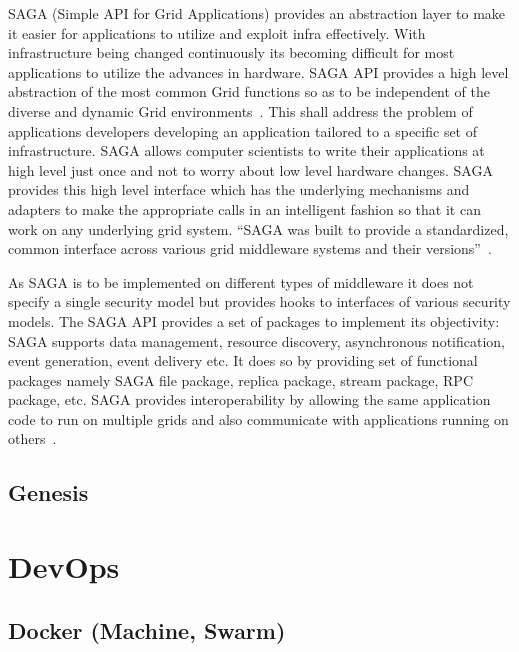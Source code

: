 {SAGA (Simple API for Grid Applications) provides an abstraction layer
to make it easier for applications to utilize and exploit infra
effectively. With infrastructure being changed continuously its
becoming difficult for most applications to utilize the advances in
hardware. SAGA API provides a high level abstraction of the most
common Grid functions so as to be independent of the diverse and
dynamic Grid environments~\cite{saga-paper}. This shall address the
problem of applications developers developing an application tailored
to a specific set of infrastructure.  SAGA allows computer scientists
to write their applications at high level just once and not to worry
about low level hardware changes. SAGA provides this high level
interface which has the underlying mechanisms and adapters to make the
appropriate calls in an intelligent fashion so that it can work on any
underlying grid system. ``SAGA was built to provide a standardized,
common interface across various grid middleware systems and their
versions''~\cite{www-saga-ogf-document}.

As SAGA is to be implemented on different types of middleware it does
not specify a single security model but provides hooks to interfaces
of various security models. The SAGA API provides a set of packages to
implement its objectivity: SAGA supports data management, resource
discovery, asynchronous notification, event generation, event delivery
etc. It does so by providing set of functional packages namely SAGA
file package, replica package, stream package, RPC package, etc. SAGA
provides interoperability by allowing the same application code to run
on multiple grids and also communicate with applications running on
others~\cite{saga-paper}.

\subsection{Genesis}

\section{DevOps}
\label{S:o-DevOps}

\subsection{Docker (Machine, Swarm)}

}
